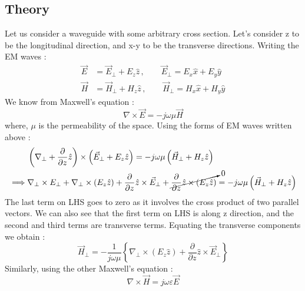 \documentclass[12pt]{article}
\begin{document}
\subsection{Theory}
Let us consider a waveguide with some arbitrary cross section.
 \linebreak
Let's consider z to be the longitudinal direction, and x-y to be the transverse directions. Writing the EM waves :
\begin{align*}
  \vec{E}&=\vec{E}_{\perp}+E_z \hat{z} \, , \qquad \vec{E}_{\perp}=E_x \hat{x}+E_y \hat{y} \\
  \vec{H}&= \vec{H}_{\perp} + H_z \hat{z} \, , \qquad \vec{H}_{\perp} = H_x \hat{x}+H_y \hat{y} 
\end{align*}
We know from Maxwell's equation :
\begin{equation}
  \nabla \times \vec{E} = -j\omega \mu \vec{H} \label{eq:2}
\end{equation}
where, $\mu$ is the permeability of the space. \linebreak
Using the forms of EM waves written above :
\begin{align*}
  & \left( \nabla_{\perp}+\dfrac{\partial}{\partial z} \hat{z} \right) \times \left( \vec{E}_{\perp}+E_z \hat{z} \right) = -j\omega \mu \left( \vec{H}_{\perp}+ H_z \hat{z} \right) \\
  \implies & \nabla_{\perp} \times E_{\perp} + \nabla_{\perp}\times \left( E_z \hat{z} \right) +\dfrac{\partial}{\partial z}\hat{z}\times \vec{E}_{\perp} + \cancelto{0}{\dfrac{\partial}{\partial z} \hat{z}\times \left( E_z \hat{z}\right)} = -j\omega \mu \left( \vec{H}_{\perp}+H_z \hat{z}\right)
\end{align*}
The last term on LHS goes to zero as it involves the cross product of two parallel vectors. \linebreak
We can also see that the first term on LHS is along z direction, and the second and third terms are transverse terms. Equating the transverse components we obtain :
\begin{equation}
  \vec{H}_{\perp}=-\dfrac{1}{j\omega \mu} \left\{ \nabla_{\perp} \times \left( E_z \hat{z} \right) + \dfrac{\partial}{\partial z} \hat{z}\times \vec{E}_{\perp} \right\} \label{eq:3}
\end{equation}
Similarly, using the other Maxwell's equation :
\begin{equation}
  \nabla \times \vec{H} = j\omega \varepsilon \vec{E} \label{eq:4}
\end{equation}
\end{document}
